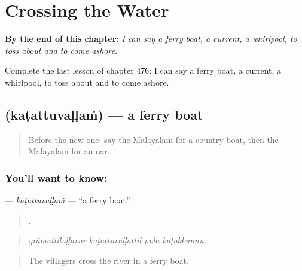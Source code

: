 
\chapter{Crossing the Water}
\label{ch:ml-crossing-the-water}

\begin{chapteropening}
\textbf{By the end of this chapter:} \emph{I can say a ferry boat, a current, a whirlpool, to toss about and to come ashore.}

Complete the last lesson of chapter 476: I can say a ferry boat, a current, a whirlpool, to toss about and to come ashore.
\end{chapteropening}

\section[\texorpdfstring{\ml{കടത്തുവള്ളം} (kaṭattuvaḷḷaṁ)}{കടത്തുവള്ളം (kaṭattuvaḷḷaṁ)}]{ (kaṭattuvaḷḷaṁ) — a ferry boat}

\label{lesson:ML-C476-katattuvallam}



\begin{quote}
Before the new one: say the Malayalam for a country boat, then the Malayalam for an oar.
\end{quote}

\subsection*{You'll want to know: }
\textbf{} — \emph{kaṭattuvaḷḷaṁ} — \textquotedblleft{}a ferry boat\textquotedblright{}.

\begin{quote}
   .
\end{quote}

\begin{quote}
\emph{grāmattiluḷḷavar kaṭattuvaḷḷattil puḻa kaṭakkunnu.}
\end{quote}

\begin{quote}
The villagers cross the river in a ferry boat.
\end{quote}

